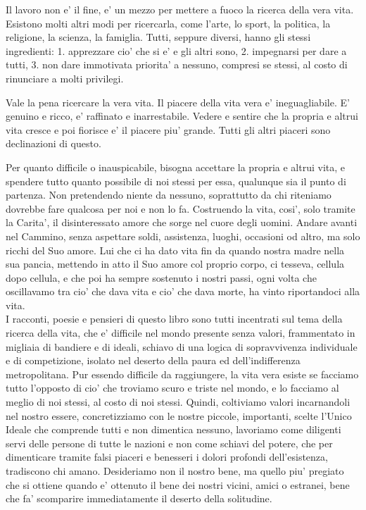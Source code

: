 Il lavoro non e' il fine, e' un mezzo per mettere a fuoco la ricerca della vera vita. Esistono molti altri modi per ricercarla, come l'arte, lo sport, la politica, la religione, la scienza, la famiglia. Tutti, seppure diversi, hanno gli stessi ingredienti: 1. apprezzare cio' che si e' e gli altri sono, 2. impegnarsi per dare a tutti, 3. non dare immotivata priorita' a nessuno, compresi se stessi, al costo di rinunciare a molti privilegi.

Vale la pena ricercare la vera vita. Il piacere della vita vera e' ineguagliabile. E' genuino e ricco, e' raffinato e inarrestabile. Vedere e sentire che la propria e altrui vita cresce e poi fiorisce e' il piacere piu' grande. Tutti gli altri piaceri sono declinazioni di questo.

Per quanto difficile o inauspicabile, bisogna accettare la propria e altrui vita, e spendere tutto quanto possibile di noi stessi per essa, qualunque sia il punto di partenza. Non pretendendo niente da nessuno, soprattutto da chi riteniamo dovrebbe fare qualcosa per noi e non lo fa. Costruendo la vita, cosi', solo tramite la Carita', il disinteressato amore che sorge nel cuore degli uomini. Andare avanti nel Cammino, senza aspettare soldi, assistenza, luoghi, occasioni od altro, ma solo ricchi del Suo amore. Lui che ci ha dato vita fin da quando nostra madre nella sua pancia, mettendo in atto il Suo amore col proprio corpo, ci tesseva, cellula dopo cellula, e che poi ha sempre sostenuto i nostri passi, ogni volta che oscillavamo tra cio' che dava vita e cio' che dava morte, ha vinto riportandoci alla vita.\\

I racconti, poesie e pensieri di questo libro sono tutti incentrati sul tema della ricerca della vita, che e' difficile nel mondo presente senza valori, frammentato in migliaia di bandiere e di ideali, schiavo di una logica di sopravvivenza individuale e di competizione, isolato nel deserto della paura ed dell'indifferenza metropolitana. 
Pur essendo difficile da raggiungere, la vita vera esiste se facciamo tutto l'opposto di cio' che troviamo scuro e triste nel mondo, e lo facciamo al meglio di noi stessi, al costo di noi stessi. Quindi, coltiviamo valori incarnandoli nel nostro essere, concretizziamo con le nostre piccole, importanti, scelte l'Unico Ideale che comprende tutti e non dimentica nessuno, lavoriamo come diligenti servi delle persone di tutte le nazioni e non come schiavi del potere, che per dimenticare tramite falsi piaceri e benesseri i dolori profondi dell'esistenza, tradiscono chi amano. Desideriamo non il nostro bene, ma quello piu' pregiato che si ottiene quando e' ottenuto il bene dei nostri vicini, amici o estranei, bene che fa' scomparire immediatamente il deserto della solitudine.

